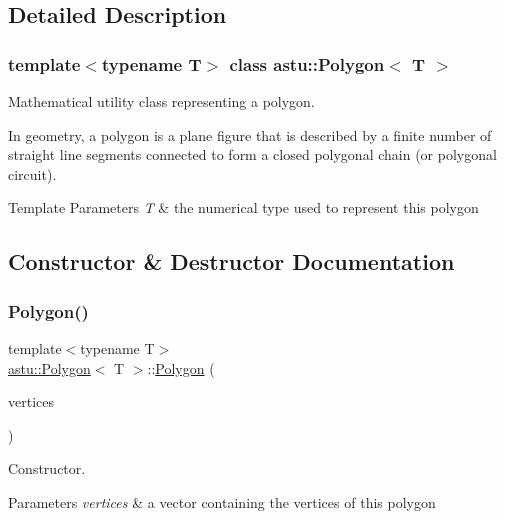 \subsection{Detailed Description}
\subsubsection*{template$<$typename T$>$\newline
class astu\+::\+Polygon$<$ T $>$}

Mathematical utility class representing a polygon.

In geometry, a polygon is a plane figure that is described by a finite number of straight line segments connected to form a closed polygonal chain (or polygonal circuit).


\begin{DoxyTemplParams}{Template Parameters}
{\em T} & the numerical type used to represent this polygon \\
\hline
\end{DoxyTemplParams}


\subsection{Constructor \& Destructor Documentation}
\mbox{\label{classastu_1_1Polygon_a673a02de1ae66a4c4d3d03c79a842467}} 
\subsubsection{\texorpdfstring{Polygon()}{Polygon()}}
{\footnotesize\ttfamily template$<$typename T$>$ \\
\hyperlink{classastu_1_1Polygon}{astu\+::\+Polygon}$<$ T $>$\+::\hyperlink{classastu_1_1Polygon}{Polygon} (\begin{DoxyParamCaption}\item[{const std\+::vector$<$ \hyperlink{classastu_1_1Vector2}{Vector2}$<$ T $>$$>$ \&}]{vertices }\end{DoxyParamCaption})\hspace{0.3cm}{\ttfamily [inline]}}

Constructor.


\begin{DoxyParams}{Parameters}
{\em vertices} & a vector containing the vertices of this polygon \\
\hline
\end{DoxyParams}

